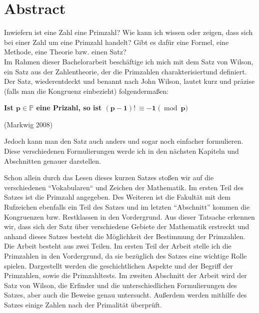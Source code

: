 %
%
\chapter{Abstract}

Inwiefern ist eine Zahl eine Primzahl? Wie kann ich wissen oder zeigen,
dass sich bei einer Zahl um eine Primzahl handelt? Gibt es dafür eine
Formel, eine Methode, eine Theorie bzw. einen Satz?\\

Im Rahmen dieser Bachelorarbeit beschäftige ich mich mit dem Satz von
Wilson, ein Satz aus der Zahlentheorie, der die Primzahlen
charakterisiertund definiert. Der Satz, wiederentdeckt und benannt nach
John Wilson, lautet kurz und präzise (falls man die Kongruenz einbezieht)
folgendermaßen:

\begin{center}
    \textbf{Ist $\bm{ p \in} \mathbb{P}$ eine Prizahl, so ist $\bm{ (p-1)! \:\equiv -1} \;\bm ( \bmod \bm{p)}$}
    
    (Markwig 2008)
\end{center}

Jedoch kann man den Satz auch anders und sogar noch einfacher formulieren.
Diese verschiedenen Formulierungen werde ich in den nächsten Kapiteln und
Abschnitten genauer darstellen.

Schon allein durch das Lesen dieses kurzen Satzes stoßen wir auf die
verschiedenen ``Vokabularen`` und Zeichen der Mathematik. Im ersten Teil
des Satzes ist die Primzahl angegeben. Des Weiteren ist die Fakultät mit
dem Rufzeichen ebenfalls ein Teil des Satzes und im letzten ``Abschnitt''
kommen die Kongruenzen bzw. Restklassen in den Vordergrund. Aus dieser
Tatsache erkennen wir, dass sich der Satz über verschiedene Gebiete der
Mathematik erstreckt und anhand dieses Satzes besteht die Möglichkeit
der Bestimmung der Primzahlen.\\

Die Arbeit besteht aus zwei Teilen. Im ersten Teil der Arbeit stelle ich
die Primzahlen in den Vordergrund, da sie bezüglich des Satzes eine
wichtige Rolle spielen. Dargestellt werden die geschichtlichen Aspekte
und der Begriff der Primzahlen, sowie die Primzahltests.
Im zweiten Abschnitt der Arbeit wird der Satz von Wilson, die Erfinder
und die unterschiedlichen Formulierungen des Satzes, aber auch die
Beweise genau untersucht. Außerdem werden mithilfe des Satzes einige
Zahlen nach der Primalität überprüft.
\newpage
